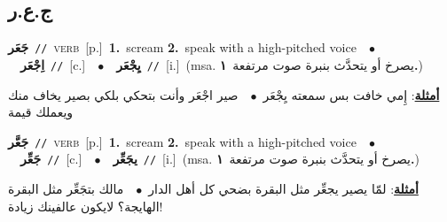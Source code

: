\documentclass[10pt,a4paper,twoside]{article} %
\begin{document}
\begin{multicols}{2}
\vspace{-3mm}
\subsection*{\color{blue}\foreignlanguage{arabic}{ج.ع.ر}\color{blue}{}} 

{\setlength\topsep{0pt}\textbf{\foreignlanguage{arabic}{جَعَر}}\ {\color{gray}\texttt{//}\color{black}}\ \textsc{verb}\ [p.]\ \textbf{1.}~scream  \textbf{2.}~speak with a high-pitched voice\ \ $\bullet$\ \ \setlength\topsep{0pt}\textbf{\foreignlanguage{arabic}{اِجْعَر}}\ {\color{gray}\texttt{//}\color{black}}\ [c.]\ \ $\bullet$\ \ \setlength\topsep{0pt}\textbf{\foreignlanguage{arabic}{يِجْعَر}}\ {\color{gray}\texttt{//}\color{black}}\ [i.]\ \color{gray}(msa. \foreignlanguage{arabic}{يصرخ أو يتحدَّث بنبرة صوت مرتفعة}~\foreignlanguage{arabic}{\textbf{١.}})\color{black}\  \begin{flushright}\color{gray}\foreignlanguage{arabic}{\textbf{\underline{\foreignlanguage{arabic}{أمثلة}}}: إِمي خافت بس سمعته يِجْعَر\ $\bullet$\ \  صير اجْعَر وأنت بتحكي بلكي بصير يخاف منك ويعملك قيمة}\end{flushright}\color{black}} \vspace{2mm}

{\setlength\topsep{0pt}\textbf{\foreignlanguage{arabic}{جَعَّر}}\ {\color{gray}\texttt{//}\color{black}}\ \textsc{verb}\ [p.]\ \textbf{1.}~scream  \textbf{2.}~speak with a high-pitched voice\ \ $\bullet$\ \ \setlength\topsep{0pt}\textbf{\foreignlanguage{arabic}{جَعِّر}}\ {\color{gray}\texttt{//}\color{black}}\ [c.]\ \ $\bullet$\ \ \setlength\topsep{0pt}\textbf{\foreignlanguage{arabic}{يجَعِّر}}\ {\color{gray}\texttt{//}\color{black}}\ [i.]\ \color{gray}(msa. \foreignlanguage{arabic}{يصرخ أو يتحدَّث بنبرة صوت مرتفعة}~\foreignlanguage{arabic}{\textbf{١.}})\color{black}\  \begin{flushright}\color{gray}\foreignlanguage{arabic}{\textbf{\underline{\foreignlanguage{arabic}{أمثلة}}}: لمّا يصير يجعِّر مثل البقرة بضحي كل أهل الدار\ $\bullet$\ \  مالك بتجَعِّر مثل البقرة الهايجة؟ لايكون عالفينك زيادة!}\end{flushright}\color{black}} \vspace{2mm}


\end{multicols}
\end{document}
